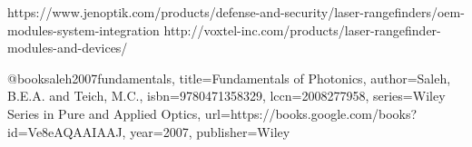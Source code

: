 
\begin{thebibliography}{99}
 https://www.jenoptik.com/products/defense-and-security/laser-rangefinders/oem-modules-system-integration
 http://voxtel-inc.com/products/laser-rangefinder-modules-and-devices/

@book{saleh2007fundamentals,
	title={Fundamentals of Photonics},
	author={Saleh, B.E.A. and Teich, M.C.},
	isbn={9780471358329},
	lccn={2008277958},
	series={Wiley Series in Pure and Applied Optics},
	url={https://books.google.com/books?id=Ve8eAQAAIAAJ},
	year={2007},
	publisher={Wiley}
}
\end{thebibliography}